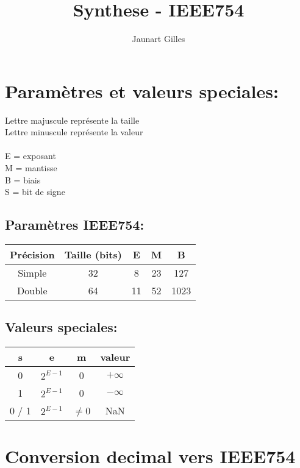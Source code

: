 \documentclass[11pt]{article}
\title{Synthese - IEEE754}
\author{Jaunart Gilles}
\date{}
\begin{document}
\maketitle

\section{Paramètres et valeurs speciales:}

Lettre majuscule représente la taille \\
Lettre minuscule représente la valeur \\
\\
E = exposant \\
M = mantisse \\
B = biais \\
S = bit de signe

\subsection{Paramètres IEEE754:}
\begin{tabular}{|c|c|c|c|c|}
\hline
\textbf{Précision} & \textbf{Taille (bits)} & \textbf{E} & \textbf{M} & \textbf{B} \\ \hline
Simple             & 32                     & 8          & 23         & 127        \\ \hline
Double             & 64                     & 11         & 52         & 1023       \\ \hline
\end{tabular}

\subsection{Valeurs speciales:}
\begin{tabular}{|c|c|c|c|}
\hline
\textbf{s} & \textbf{e} & \textbf{m} & \textbf{valeur} \\ \hline
0          & $2^{E-1}$  & 0          & $+ \infty$      \\ \hline
1          & $2^{E-1}$  & 0          & $- \infty$      \\ \hline
0 / 1      & $2^{E-1}$  & $\neq$0    & NaN             \\ \hline
\end{tabular}

\newpage

\section{Conversion decimal vers IEEE754}
\end{document}
